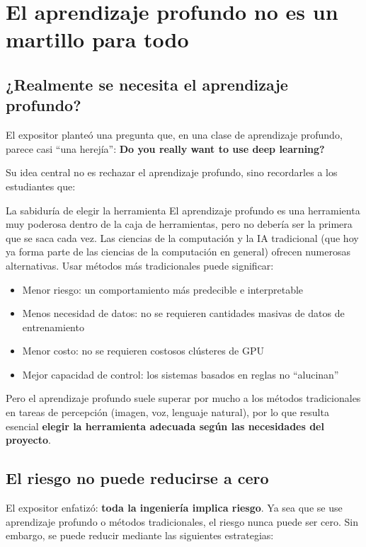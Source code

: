 \section{El aprendizaje profundo no es un martillo para todo}

\subsection{¿Realmente se necesita el aprendizaje profundo?}

El expositor planteó una pregunta que, en una clase de aprendizaje profundo, parece casi ``una herejía'': \textbf{Do you really want to use deep learning?}

Su idea central no es rechazar el aprendizaje profundo, sino recordarles a los estudiantes que:

\begin{knowledgebox}{La sabiduría de elegir la herramienta}
El aprendizaje profundo es una herramienta muy poderosa dentro de la caja de herramientas, pero no debería ser la primera que se saca cada vez. Las ciencias de la computación y la IA tradicional (que hoy ya forma parte de las ciencias de la computación en general) ofrecen numerosas alternativas. Usar métodos más tradicionales puede significar:
\begin{itemize}
    \item Menor riesgo: un comportamiento más predecible e interpretable
    \item Menos necesidad de datos: no se requieren cantidades masivas de datos de entrenamiento
    \item Menor costo: no se requieren costosos clústeres de GPU
    \item Mejor capacidad de control: los sistemas basados en reglas no ``alucinan''
\end{itemize}
Pero el aprendizaje profundo suele superar por mucho a los métodos tradicionales en tareas de percepción (imagen, voz, lenguaje natural), por lo que resulta esencial \textbf{elegir la herramienta adecuada según las necesidades del proyecto}.
\end{knowledgebox}

\subsection{El riesgo no puede reducirse a cero}

El expositor enfatizó: \textbf{toda la ingeniería implica riesgo}. Ya sea que se use aprendizaje profundo o métodos tradicionales, el riesgo nunca puede ser cero. Sin embargo, se puede reducir mediante las siguientes estrategias:

